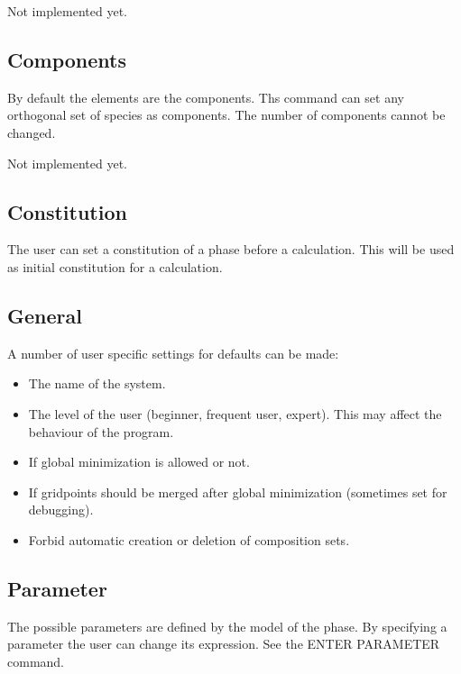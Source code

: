 \documentclass[12pt]{article}
\begin{document}
Not implemented yet.

\subsection{Components}

By default the elements are the components.  Ths command can set any
orthogonal set of species as components.  The number of components
cannot be changed.

Not implemented yet.

\subsection{Constitution}

The user can set a constitution of a phase before a calculation.  This
will be used as initial constitution for a calculation.

\subsection{General}

A number of user specific settings for defaults can be made:

\begin{itemize}
\item The name of the system.

\item The level of the user (beginner, frequent user, expert).  This
may affect the behaviour of the program.

\item If global minimization is allowed or not.

\item If gridpoints should be merged after global minimization
(sometimes set for debugging).

\item Forbid automatic creation or deletion of composition sets.
\end{itemize}

\subsection{Parameter}

The possible parameters are defined by the model of the phase.  By
specifying a parameter the user can change its expression.  See the
ENTER PARAMETER command.
\end{document}
